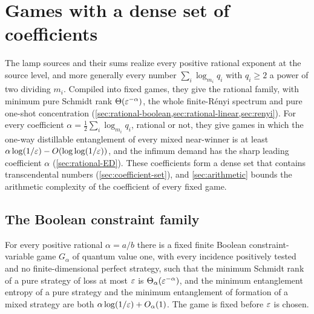 \section{Games with a dense set of coefficients}\label{sec:rational}

The lamp sources and their sums realize every positive rational exponent at the source level, and more generally every number
$\sum_i\log_{m_i}q_i$ with $q_i\ge2$ a power of two dividing $m_i$. Compiled into fixed games, they give the rational family, with
minimum pure Schmidt rank $\Theta(\varepsilon^{-\alpha})$, the whole finite-R\'enyi spectrum and pure one-shot concentration
(\cref{sec:rational-boolean,sec:rational-linear,sec:renyi}). For every coefficient $\alpha=\frac12\sum_i\log_{m_i}q_i$, rational or not, they
give games in which the one-way distillable entanglement of every mixed near-winner is at least
$\alpha\log(1/\varepsilon)-O(\log\log(1/\varepsilon))$, and the infimum demand has the sharp leading coefficient $\alpha$ (\cref{sec:rational-ED}). These coefficients form a dense set that contains transcendental numbers (\cref{sec:coefficient-set}), and
\cref{sec:arithmetic} bounds the arithmetic complexity of the coefficient of every fixed game.

\subsection{The Boolean constraint family}\label{sec:rational-boolean}

\begin{theorem}\label{thm:rational-games}
For every positive rational $\alpha=a/b$ there is a fixed finite Boolean constraint-variable game $G_\alpha$ of quantum value
one, with every incidence positively tested and no finite-dimensional perfect strategy, such that the minimum Schmidt rank of
a pure strategy of loss at most $\varepsilon$ is $\Theta_\alpha(\varepsilon^{-\alpha})$, and the minimum entanglement entropy of a pure
strategy and the minimum entanglement of formation of a mixed strategy are both $\alpha\log(1/\varepsilon)+O_\alpha(1)$. The game is
fixed before $\varepsilon$ is chosen.
\end{theorem}

